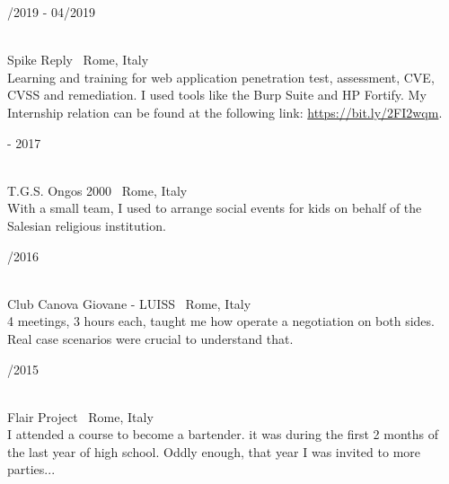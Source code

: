 \begin{minipage}{.3\textwidth}
	/2019 - 04/2019 \faCalendar
\end{minipage}
\hfill
\begin{minipage}{.65\textwidth}
	\vfill
	 \\
	\color{Maroon} Spike Reply \color{Sepia} \hfill \faMapMarker \ Rome, Italy
	\smallskip
	\\
	\color{gray} Learning and training for web application penetration test, assessment, CVE, CVSS and remediation. I used tools like the Burp Suite and HP Fortify. My Internship relation can be found at the following link: \url{https://bit.ly/2FI2wqm}.
	\vfill
\end{minipage}

\bigskip

\begin{minipage}{.3\textwidth}
	 - 2017 \faCalendar
\end{minipage}
\hfill
\begin{minipage}{.65\textwidth}
	\vfill
	 \\
	\color{Maroon} T.G.S. Ongos 2000 \color{Sepia} \hfill \faMapMarker \ Rome, Italy
	\smallskip
	\\
	\color{gray} With a small team, I used to arrange social events for kids on behalf of the Salesian religious institution. 
	\vfill
\end{minipage}

\bigskip

\begin{minipage}{.3\textwidth}
	/2016 \faCalendar
\end{minipage}
\hfill
\begin{minipage}{.65\textwidth}
	\vfill
	 \\
	\color{Maroon} Club Canova Giovane - LUISS \color{Sepia} \hfill \faMapMarker \ Rome, Italy
	\smallskip
	\\
	\color{gray} 4 meetings, 3 hours each, taught me how operate a negotiation on both sides. Real case scenarios were crucial to understand that. 
	\vfill
\end{minipage}

\bigskip

\begin{minipage}{.3\textwidth}
	/2015 \faCalendar
\end{minipage}
\hfill
\begin{minipage}{.65\textwidth}
	\vfill
	 \\
	\color{Maroon} Flair Project \color{Sepia} \hfill \faMapMarker \ Rome, Italy
	\smallskip
	\\
	\color{gray} I attended a course to become a bartender. it was during the first 2 months of the last year of high school. Oddly enough, that year I was invited to more parties...
	\vfill
\end{minipage}

